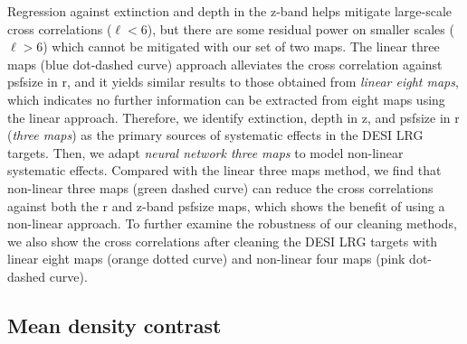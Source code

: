 Regression against extinction and depth in the z-band helps mitigate large-scale cross correlations ($\ell < 6$), but there are some residual power on smaller scales ($\ell > 6$) which cannot be mitigated with our set of two maps. The linear three maps (blue dot-dashed curve) approach alleviates the cross correlation against psfsize in r, and it yields similar results to those obtained from \textit{linear eight maps}, which indicates no further information can be extracted from eight maps using the linear approach. Therefore, we identify extinction, depth in z, and psfsize in r (\textit{three maps}) as the primary sources of systematic effects in the DESI LRG targets. Then, we adapt \textit{neural network three maps} to model non-linear systematic effects. Compared with the linear three maps method, we find that non-linear three maps (green dashed curve) can reduce the cross correlations against both the r and z-band psfsize maps, which shows the benefit of using a non-linear approach. To further examine the robustness of our cleaning methods, we also show the cross correlations after cleaning the DESI LRG targets with linear eight maps (orange dotted curve) and non-linear four maps (pink dot-dashed curve). 

\subsection{Mean density contrast}

